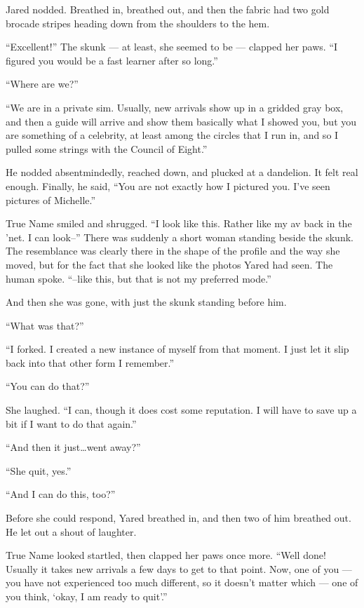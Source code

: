 Jared nodded. Breathed in, breathed out, and then the fabric had two gold brocade stripes heading down from the shoulders to the hem.

``Excellent!'' The skunk — at least, she seemed to be — clapped her paws. ``I figured you would be a fast learner after so long.''

``Where are we?''

``We are in a private sim. Usually, new arrivals show up in a gridded gray box, and then a guide will arrive and show them basically what I showed you, but you are something of a celebrity, at least among the circles that I run in, and so I pulled some strings with the Council of Eight.''

He nodded absentmindedly, reached down, and plucked at a dandelion. It felt real enough. Finally, he said, ``You are not exactly how I pictured you. I've seen pictures of Michelle.''

True Name smiled and shrugged. ``I look like this. Rather like my av back in the 'net. I can look--'' There was suddenly a short woman standing beside the skunk. The resemblance was clearly there in the shape of the profile and the way she moved, but for the fact that she looked like the photos Yared had seen. The human spoke. ``--like this, but that is not my preferred mode.''

And then she was gone, with just the skunk standing before him.

``What was that?''

``I forked. I created a new instance of myself from that moment. I just let it slip back into that other form I remember.''

``You can do that?''

She laughed. ``I can, though it does cost some reputation. I will have to save up a bit if I want to do that again.''

``And then it just\ldots went away?''

``She quit, yes.''

``And I can do this, too?''

Before she could respond, Yared breathed in, and then two of him breathed out. He let out a shout of laughter.

True Name looked startled, then clapped her paws once more. ``Well done! Usually it takes new arrivals a few days to get to that point. Now, one of you — you have not experienced too much different, so it doesn't matter which — one of you think, `okay, I am ready to quit'.''

